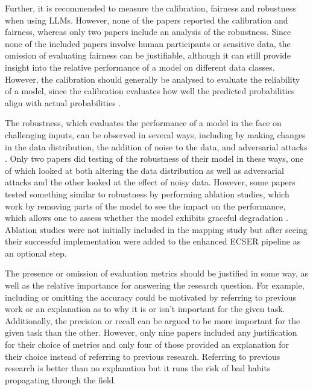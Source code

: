 \documentclass[a4paper]{article}
\begin{document}
Further, it is recommended to measure the calibration, fairness and robustness when using LLMs. However, none of the papers reported the calibration and fairness, whereas only two papers include an analysis of the robustness. Since none of the included papers involve human participants or sensitive data, the omission of evaluating fairness can be justifiable, although it can still provide insight into the relative performance of a model on different data classes. However, the calibration should generally be analysed to evaluate the reliability of a model, since the calibration evaluates how well the predicted probabilities align with actual probabilities \cite{nixon2019calibration,guo2017calibration}. 

The robustness, which evaluates the performance of a model in the face on challenging inputs, can be observed in several ways, including by making changes in the data distribution, the addition of noise to the data, and adversarial attacks \cite{chang2023}. Only two papers did testing of the robustness of their model in these ways, one of which looked at both altering the data distribution as well as adversarial attacks and the other looked at the effect of noisy data. However, some papers tested something similar to robustness by performing ablation studies, which work by removing parts of the model to see the impact on the performance, which allows one to assess whether the model exhibits graceful degradation \cite{meyes2019ablation}. Ablation studies were not initially included in the mapping study but after seeing their successful implementation were added to the enhanced ECSER pipeline as an optional step.

The presence or omission of evaluation metrics should be justified in some way, as well as the relative importance for answering the research question. For example, including or omitting the accuracy could be motivated by referring to previous work or an explanation as to why it is or isn't important for the given task. Additionally, the precision or recall can be argued to be more important for the given task than the other. However, only nine papers included any justification for their choice of metrics and only four of those provided an explanation for their choice instead of referring to previous research. Referring to previous research is better than no explanation but it runs the risk of bad habits propagating through the field.
\end{document}
